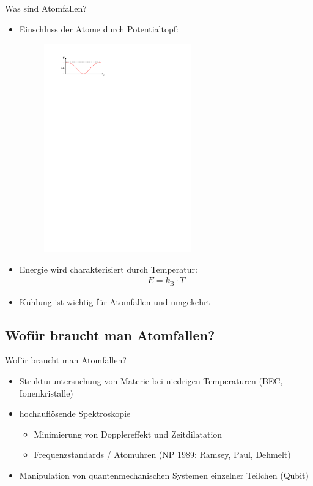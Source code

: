 \documentclass[12pt,xcolor=dvipsnames]{beamer}
\begin{document}
\begin{frame}{Was sind Atomfallen?}
	\begin{itemize}
		\item Einschluss der Atome durch Potentialtopf:
			\begin{figure}
				\centering
				\includegraphics[width=0.6\textwidth]{./figures/fallentiefe.pdf}
			\end{figure}
		\item Energie wird charakterisiert durch Temperatur:
		\begin{align*}
		E = k_\mathrm{B} \cdot T
		\end{align*}
		
		\item Kühlung ist wichtig für Atomfallen und umgekehrt
		
	\end{itemize}

\end{frame}

\subsection{Wofür braucht man Atomfallen?}
\begin{frame}{Wofür braucht man Atomfallen?}
	\begin{itemize}
		\item Strukturuntersuchung von Materie bei niedrigen Temperaturen (BEC, Ionenkristalle)
		
		\item hochauflösende Spektroskopie
			\begin{itemize}
				\item Minimierung von Dopplereffekt und Zeitdilatation
				\item Frequenzstandards / Atomuhren (NP 1989: Ramsey, Paul, Dehmelt)
			\end{itemize}
		
		\item Manipulation von quantenmechanischen Systemen einzelner Teilchen (Qubit)
	\end{itemize}
\end{frame}
\end{document}
